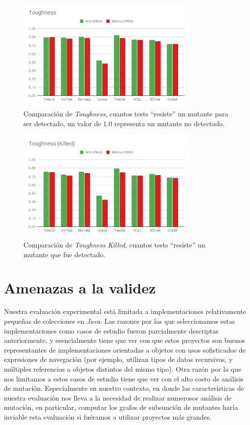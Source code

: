 \begin{figure}
	\begin{center}
		\includegraphics[width=9cm]{figures/Toughness.png}
	\end{center}
	\caption[Comparaci\'on de \emph{Toughness}]{Comparaci\'on de \emph{Toughness}, cuantos tests ``resiste'' un mutante para ser detectado, un valor de $1.0$ representa un mutante no detectado.}
	\label{toughness-results}
\end{figure}

\begin{figure}
	\begin{center}
		\includegraphics[width=9cm]{figures/ToughnessKilled.png}
	\end{center}
	\caption[Comparaci\'on de \emph{Toughness Killed}]{Comparaci\'on de \emph{Toughness Killed}, cuantos tests ``resiste'' un mutante que fue detectado.}
	\label{toughnessKilled-results}
\end{figure}


\section{Amenazas a la validez}

Nuestra evaluaci\'on experimental est\'a limitada a implementaciones relativamente peque\~nas de colecciones en \emph{Java}. Las razones por las que seleccionamos estas implementaciones como casos de estudio fueron parcialmente descriptas anteriormente, y esencialmente tiene que ver con que estos proyectos son buenos representantes de implementaciones orientadas a objetos con usos sofisticados de expresiones de navegaci\'on (por ejemplo, utilizan tipos de datos recursivos, y m\'ultiples referencias a objetos distintos del mismo tipo). Otra raz\'on por la que nos limitamos a estos casos de estudio tiene que ver con el alto costo de an\'alisis de mutaci\'on. Especialmente en nuestro contexto, en donde las caracter\'isticas de nuestra evaluaci\'on nos lleva a la necesidad de realizar numerosos an\'alisis de mutaci\'on, en particular, computar los grafos de subsunci\'on de mutantes har\'ia inviable esta evaluaci\'on si fu\'eramos a utilizar proyectos m\'as grandes.

